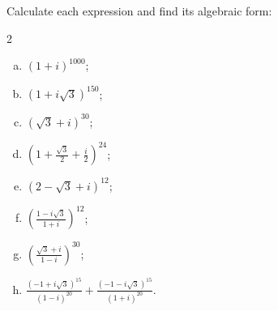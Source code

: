 
\begin{problem}
Calculate each expression and find its algebraic form:
\begin{multicols}{2}
\begin{enumerate}[a)]
\item $(1+i)^{1000}$;

\item $(1+i \sqrt{3})^{150}$;

\item $(\sqrt{3}+i)^{30}$;

\item $\left(1+\frac{\sqrt{3}}{2}+\frac{i}{2}\right)^{24}$;

\item $(2-\sqrt{3}+i)^{12}$;

\item $\left(\frac{1-i \sqrt{3}}{1+i}\right)^{12}$;

\item $\left(\frac{\sqrt{3}+i}{1-i}\right)^{30}$;

\item $\frac{(-1+i \sqrt{3})^{15}}{(1-i)^{20}}+\frac{(-1-i \sqrt{3})^{15}}{(1+i)^{20}}$.
\end{enumerate}
\end{multicols}
\end{problem} 

